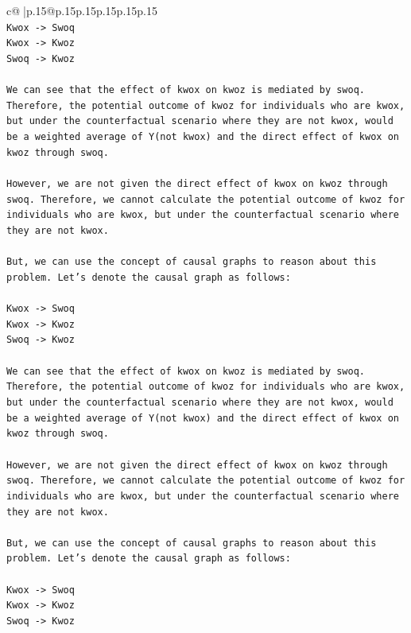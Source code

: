 \documentclass{article}
\begin{document}
{\begin{supertabular}{c@{$\;$}|p{.15\linewidth}@{}p{.15\linewidth}p{.15\linewidth}p{.15\linewidth}p{.15\linewidth}p{.15\linewidth}}
{{{\\ 
\texttt{Kwox {-}> Swoq} \\
\texttt{Kwox {-}> Kwoz} \\
\texttt{Swoq {-}> Kwoz} \\
\\ 
\texttt{We can see that the effect of kwox on kwoz is mediated by swoq. Therefore, the potential outcome of kwoz for individuals who are kwox, but under the counterfactual scenario where they are not kwox, would be a weighted average of Y(not kwox) and the direct effect of kwox on kwoz through swoq.} \\
\\ 
\texttt{However, we are not given the direct effect of kwox on kwoz through swoq. Therefore, we cannot calculate the potential outcome of kwoz for individuals who are kwox, but under the counterfactual scenario where they are not kwox.} \\
\\ 
\texttt{But, we can use the concept of causal graphs to reason about this problem. Let's denote the causal graph as follows:} \\
\\ 
\texttt{Kwox {-}> Swoq} \\
\texttt{Kwox {-}> Kwoz} \\
\texttt{Swoq {-}> Kwoz} \\
\\ 
\texttt{We can see that the effect of kwox on kwoz is mediated by swoq. Therefore, the potential outcome of kwoz for individuals who are kwox, but under the counterfactual scenario where they are not kwox, would be a weighted average of Y(not kwox) and the direct effect of kwox on kwoz through swoq.} \\
\\ 
\texttt{However, we are not given the direct effect of kwox on kwoz through swoq. Therefore, we cannot calculate the potential outcome of kwoz for individuals who are kwox, but under the counterfactual scenario where they are not kwox.} \\
\\ 
\texttt{But, we can use the concept of causal graphs to reason about this problem. Let's denote the causal graph as follows:} \\
\\ 
\texttt{Kwox {-}> Swoq} \\
\texttt{Kwox {-}> Kwoz} \\
\texttt{Swoq {-}> Kwoz} \\
\\ 
}}}
\end{supertabular}}
\end{document}
